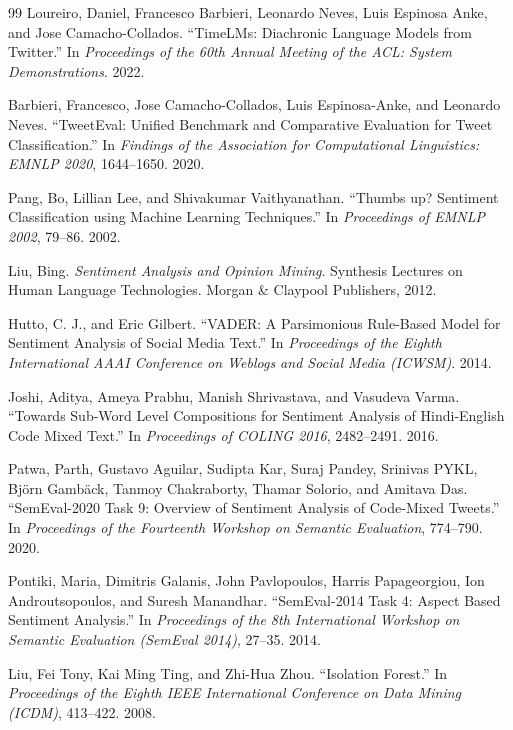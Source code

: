 \begin{thebibliography}{99}
Loureiro, Daniel, Francesco Barbieri, Leonardo Neves, Luis Espinosa Anke, and Jose Camacho-Collados. ``TimeLMs: Diachronic Language Models from Twitter.'' In \textit{Proceedings of the 60th Annual Meeting of the ACL: System Demonstrations}. 2022.

Barbieri, Francesco, Jose Camacho-Collados, Luis Espinosa-Anke, and Leonardo Neves. ``TweetEval: Unified Benchmark and Comparative Evaluation for Tweet Classification.'' In \textit{Findings of the Association for Computational Linguistics: EMNLP 2020}, 1644--1650. 2020.

Pang, Bo, Lillian Lee, and Shivakumar Vaithyanathan. ``Thumbs up? Sentiment Classification using Machine Learning Techniques.'' In \textit{Proceedings of EMNLP 2002}, 79--86. 2002.

Liu, Bing. \textit{Sentiment Analysis and Opinion Mining}. Synthesis Lectures on Human Language Technologies. Morgan \& Claypool Publishers, 2012.

Hutto, C. J., and Eric Gilbert. ``VADER: A Parsimonious Rule-Based Model for Sentiment Analysis of Social Media Text.'' In \textit{Proceedings of the Eighth International AAAI Conference on Weblogs and Social Media (ICWSM)}. 2014.

Joshi, Aditya, Ameya Prabhu, Manish Shrivastava, and Vasudeva Varma. ``Towards Sub-Word Level Compositions for Sentiment Analysis of Hindi-English Code Mixed Text.'' In \textit{Proceedings of COLING 2016}, 2482--2491. 2016.

Patwa, Parth, Gustavo Aguilar, Sudipta Kar, Suraj Pandey, Srinivas PYKL, Bj\"orn Gamb\"ack, Tanmoy Chakraborty, Thamar Solorio, and Amitava Das. ``SemEval-2020 Task 9: Overview of Sentiment Analysis of Code-Mixed Tweets.'' In \textit{Proceedings of the Fourteenth Workshop on Semantic Evaluation}, 774--790. 2020.

Pontiki, Maria, Dimitris Galanis, John Pavlopoulos, Harris Papageorgiou, Ion Androutsopoulos, and Suresh Manandhar. ``SemEval-2014 Task 4: Aspect Based Sentiment Analysis.'' In \textit{Proceedings of the 8th International Workshop on Semantic Evaluation (SemEval 2014)}, 27--35. 2014.

Liu, Fei Tony, Kai Ming Ting, and Zhi-Hua Zhou. ``Isolation Forest.'' In \textit{Proceedings of the Eighth IEEE International Conference on Data Mining (ICDM)}, 413--422. 2008.


\end{thebibliography}
